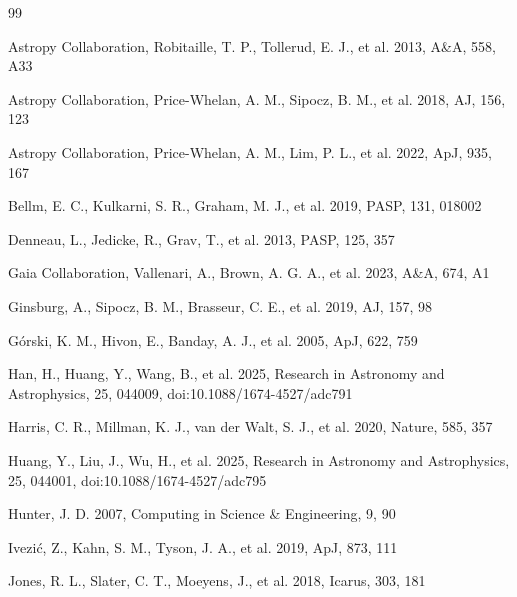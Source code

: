\documentclass[referee]{raa}
\begin{document}
\clearpage



\clearpage

\begin{thebibliography}{99}

Astropy Collaboration, Robitaille, T. P., Tollerud, E. J., et al. 2013, A\&A, 558, A33

Astropy Collaboration, Price-Whelan, A. M., Sipocz, B. M., et al. 2018, AJ, 156, 123

Astropy Collaboration, Price-Whelan, A. M., Lim, P. L., et al. 2022, ApJ, 935, 167

Bellm, E. C., Kulkarni, S. R., Graham, M. J., et al. 2019, PASP, 131, 018002

Denneau, L., Jedicke, R., Grav, T., et al. 2013, PASP, 125, 357

Gaia Collaboration, Vallenari, A., Brown, A. G. A., et al. 2023, A\&A, 674, A1

Ginsburg, A., Sipocz, B. M., Brasseur, C. E., et al. 2019, AJ, 157, 98

G\'orski, K. M., Hivon, E., Banday, A. J., et al. 2005, ApJ, 622, 759

Han, H., Huang, Y., Wang, B., et al. 2025, Research in Astronomy and Astrophysics, 25, 044009, doi:10.1088/1674-4527/adc791

Harris, C. R., Millman, K. J., van der Walt, S. J., et al. 2020, Nature, 585, 357

Huang, Y., Liu, J., Wu, H., et al. 2025, Research in Astronomy and Astrophysics, 25, 044001, doi:10.1088/1674-4527/adc795

Hunter, J. D. 2007, Computing in Science \& Engineering, 9, 90

Ivezi\'c, Z., Kahn, S. M., Tyson, J. A., et al. 2019, ApJ, 873, 111

Jones, R. L., Slater, C. T., Moeyens, J., et al. 2018, Icarus, 303, 181


\end{thebibliography}
\end{document}
